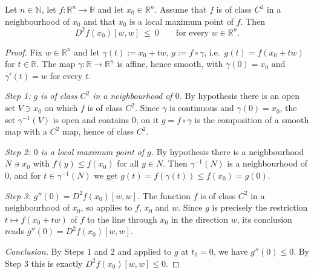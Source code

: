 \begin{lemma}
Let $n\in\mathbb{N}$, let $f:\mathbb{R}^n\to\mathbb{R}$ and let $x_0\in\mathbb{R}^n$. Assume that
$f$ is of class $C^2$ in a neighbourhood of $x_0$ and that $x_0$ is a local maximum point of $f$.
Then
$$D^2f(x_0)[w,w]\ \leq\ 0\qquad\text{for every }w\in\mathbb{R}^n .$$
\end{lemma}
\begin{proof}
Fix $w\in\mathbb{R}^n$ and let $\gamma(t):=x_0+tw$, $g:=f\circ\gamma$, i.e.\ $g(t)=f(x_0+tw)$ for
$t\in\mathbb{R}$. The map $\gamma:\mathbb{R}\to\mathbb{R}^n$ is affine, hence smooth, with
$\gamma(0)=x_0$ and $\gamma'(t)=w$ for every $t$.

\emph{Step 1: $g$ is of class $C^2$ in a neighbourhood of $0$.} By hypothesis there is an open set
$V\ni x_0$ on which $f$ is of class $C^2$. Since $\gamma$ is continuous and $\gamma(0)=x_0$, the
set $\gamma^{-1}(V)$ is open and contains $0$; on it $g=f\circ\gamma$ is the composition of a
smooth map with a $C^2$ map, hence of class $C^2$.

\emph{Step 2: $0$ is a local maximum point of $g$.} By hypothesis there is a neighbourhood
$N\ni x_0$ with $f(y)\leq f(x_0)$ for all $y\in N$. Then $\gamma^{-1}(N)$ is a neighbourhood of
$0$, and for $t\in\gamma^{-1}(N)$ we get $g(t)=f(\gamma(t))\leq f(x_0)=g(0)$.

\emph{Step 3: $g''(0)=D^2f(x_0)[w,w]$.} The function $f$ is of class $C^2$ in a neighbourhood of
$x_0$, so  applies to $f$, $x_0$ and $w$. Since $g$ is precisely
the restriction $t\mapsto f(x_0+tw)$ of $f$ to the line through $x_0$ in the direction $w$, its
conclusion reads $g''(0)=D^2f(x_0)[w,w]$.

\emph{Conclusion.} By Steps 1 and 2 and  applied to $g$ at
$t_0=0$, we have $g''(0)\leq0$. By Step 3 this is exactly $D^2f(x_0)[w,w]\leq0$.
\end{proof}
